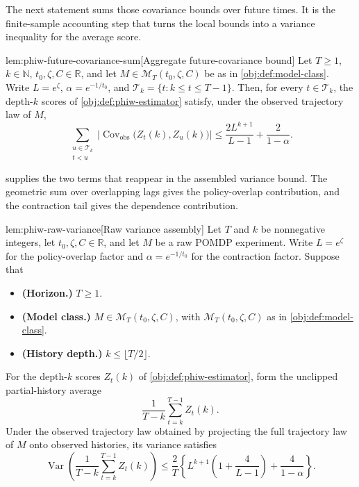 The next statement sums those covariance bounds over future times. It is the finite-sample accounting step that turns the local bounds into a variance inequality for the average score.

\begin{lemmav}{lem:phiw-future-covariance-sum}[Aggregate future-covariance bound]
Let \(T\ge1\), \(k\in\mathbb N\), \(t_0,\zeta,C\in\mathbb R\), and let \(M\in\mathcal M_T(t_0,\zeta,C)\) be as in \cref{obj:def:model-class}. Write \(L=e^{\zeta}\), \(\alpha=e^{-1/t_0}\), and \(\mathscr T_k=\{t:k\le t\le T-1\}\). Then, for every \(t\in\mathscr T_k\), the depth-\(k\) scores of \cref{obj:def:phiw-estimator} satisfy, under the observed trajectory law of \(M\),
\[
\sum_{\substack{u\in\mathscr T_k\\ t<u}}
\bigl|\operatorname{Cov}_{\mathrm{obs}}\bigl(Z_t(k),Z_u(k)\bigr)\bigr|
\le
\frac{2L^{k+1}}{L-1}+\frac{2}{1-\alpha}.
\]
\end{lemmav}

 supplies the two terms that reappear in the assembled variance bound. The geometric sum over overlapping lags gives the policy-overlap contribution, and the contraction tail gives the dependence contribution.

\begin{lemmav}{lem:phiw-raw-variance}[Raw variance assembly]
Let \(T\) and \(k\) be nonnegative integers, let \(t_0,\zeta,C\in\mathbb R\), and let \(M\) be a raw POMDP experiment. Write \(L=e^\zeta\) for the policy-overlap factor and \(\alpha=e^{-1/t_0}\) for the contraction factor. Suppose that
\begin{itemize}
\item \textbf{(Horizon.)} \(T\ge 1\).
\item \textbf{(Model class.)} \(M\in\mathcal M_T(t_0,\zeta,C)\), with \(\mathcal M_T(t_0,\zeta,C)\) as in \cref{obj:def:model-class}.
\item \textbf{(History depth.)} \(k\le \lfloor T/2\rfloor\).
\end{itemize}
For the depth-\(k\) scores \(Z_t(k)\) of \cref{obj:def:phiw-estimator}, form the unclipped partial-history average
\[
\frac{1}{T-k}\sum_{t=k}^{T-1} Z_t(k).
\]
Under the observed trajectory law obtained by projecting the full trajectory law of \(M\) onto observed histories, its variance satisfies
\[
\operatorname{Var}\!\left(\frac{1}{T-k}\sum_{t=k}^{T-1} Z_t(k)\right)
\le
\frac{2}{T}\left\{
L^{k+1}\left(1+\frac{4}{L-1}\right)
+
\frac{4}{1-\alpha}
\right\}.
\]
\end{lemmav}

